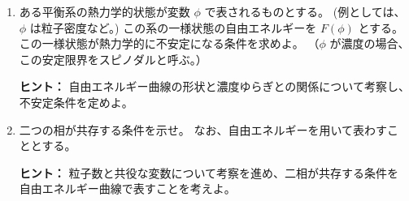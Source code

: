 \documentclass[uplatex,dvipdfmx,a4paper,11pt]{jsarticle}
\begin{document}
\vspace{10pt}

\begin{enumerate}
\setlength{\parskip}{0cm} %
\setlength{\itemsep}{0.5cm} %

\item
ある平衡系の熱力学的状態が変数 $\phi$ で表されるものとする。
(例としては、$\phi$ は粒子密度など。) 
この系の一様状態の自由エネルギーを $F(\phi)$ とする。
この一様状態が熱力学的に不安定になる条件を求めよ。
（$\phi$ が濃度の場合、この安定限界をスピノダルと呼ぶ。）

\begin{itembox}[l]{{\bf ヒント：}}
自由エネルギー曲線の形状と濃度ゆらぎとの関係について考察し、不安定条件を定めよ。
\end{itembox}

\item
二つの相が共存する条件を示せ。
なお、自由エネルギーを用いて表わすこととする。

\begin{itembox}[l]{{\bf ヒント：}}
粒子数と共役な変数について考察を進め、二相が共存する条件を自由エネルギー曲線で表すことを考えよ。
\end{itembox}

\end{enumerate}


\newpage
\end{document}
